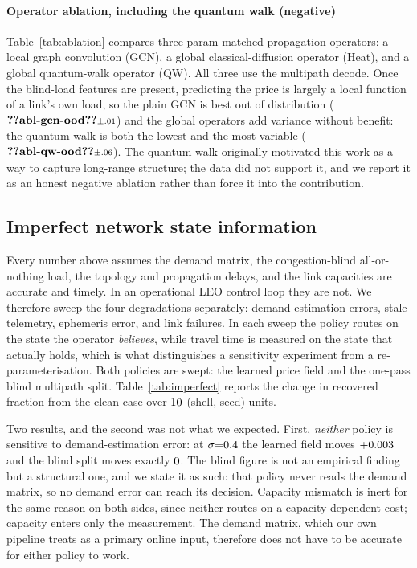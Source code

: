 \documentclass[journal]{IEEEtran}
\begin{document}
\paragraph{Operator ablation, including the quantum walk (negative)}\label{sec:ablation}
Table~\ref{tab:ablation} compares three param-matched propagation operators: a local
graph convolution (GCN), a global classical-diffusion operator (Heat), and a global
quantum-walk operator (QW). All three use the multipath decode. Once the blind-load
features are present, predicting the price is largely a local function of a link's own
load, so the plain GCN is best out of distribution ($\clm{abl-gcn-ood}{\scriptstyle\pm.01}$) and the global operators
add variance without benefit: the quantum walk is both the lowest and the most variable
($\clm{abl-qw-ood}{\scriptstyle\pm.06}$). The quantum walk originally motivated this work as a way to capture long-range
structure; the data did not support it, and we report it as an honest negative ablation
rather than force it into the contribution.





\subsection{Imperfect network state information}\label{sec:imperfect}
Every number above assumes the demand matrix, the congestion-blind all-or-nothing load, the
topology and propagation delays, and the link capacities are accurate and timely. In an
operational LEO control loop they are not. We therefore sweep the four degradations
separately: demand-estimation errors, stale telemetry, ephemeris error, and link failures.
In each sweep the policy routes on the state the operator \emph{believes}, while travel time
is measured on the state that actually holds, which is what distinguishes a sensitivity
experiment from a re-parameterisation. Both policies are swept: the learned price field and
the one-pass blind multipath split. Table~\ref{tab:imperfect} reports the change in recovered
fraction from the clean case over $10$ (shell, seed) units.

Two results, and the second was not what we expected. First, \emph{neither} policy is
sensitive to demand-estimation error: at $\sigma{=}0.4$ the learned field moves
$+0.003$ and the blind split moves exactly $0$. The blind figure is
not an empirical finding but a structural one, and we state it as such: that policy never
reads the demand matrix, so no demand error can reach its decision. Capacity mismatch is
inert for the same reason on both sides, since neither routes on a capacity-dependent cost;
capacity enters only the measurement. The demand matrix, which our own pipeline treats as a
primary online input, therefore does not have to be accurate for either policy to work.
\end{document}
